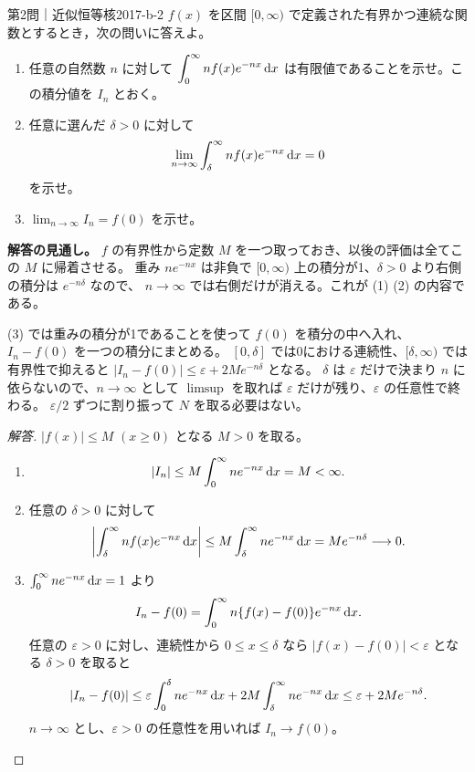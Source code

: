 \begin{problem}{第2問｜近似恒等核}{2017-b-2}
$f(x)$ を区間 $[0,\infty)$ で定義された有界かつ連続な関数とするとき，次の問いに答えよ。
\begin{enumerate}
  \item[(1)] 任意の自然数 $n$ に対して $\displaystyle\int_0^\infty nf(x)e^{-nx}\,\mathrm{d} x$ は有限値であることを示せ。この積分値を $I_n$ とおく。
  \item[(2)] 任意に選んだ $\delta>0$ に対して
  \[
  \lim_{n\to\infty}\int_\delta^\infty nf(x)e^{-nx}\,\mathrm{d} x=0
  \]
  を示せ。
  \item[(3)] $\displaystyle\lim_{n\to\infty}I_n=f(0)$ を示せ。
\end{enumerate}
\end{problem}
\begin{memo*}
\textbf{解答の見通し。}
$f$ の有界性から定数 $M$ を一つ取っておき、以後の評価は全てこの $M$ に帰着させる。
重み $ne^{-nx}$ は非負で $[0,\infty)$ 上の積分が1、$\delta>0$ より右側の積分は $e^{-n\delta}$ なので、
$n\to\infty$ では右側だけが消える。これが (1) (2) の内容である。

(3) では重みの積分が1であることを使って $f(0)$ を積分の中へ入れ、$I_n-f(0)$ を一つの積分にまとめる。
$[0,\delta]$ では0における連続性、$[\delta,\infty)$ では有界性で抑えると
$|I_n-f(0)|\le\varepsilon+2Me^{-n\delta}$ となる。
$\delta$ は $\varepsilon$ だけで決まり $n$ に依らないので、$n\to\infty$ として $\limsup$ を取れば
$\varepsilon$ だけが残り、$\varepsilon$ の任意性で終わる。
$\varepsilon/2$ ずつに割り振って $N$ を取る必要はない。
\end{memo*}
\begin{proof}[解答]
$|f(x)|\le M$ $(x\ge0)$ となる $M>0$ を取る。
\begin{enumerate}
  \item[(1)]
  \[
  |I_n|\le M\int_0^\infty ne^{-nx}\,\mathrm{d} x=M<\infty.
  \]

  \item[(2)] 任意の $\delta>0$ に対して
  \[
  \left|\int_\delta^\infty nf(x)e^{-nx}\,\mathrm{d} x\right|
  \le M\int_\delta^\infty ne^{-nx}\,\mathrm{d} x
  =Me^{-n\delta}\longrightarrow0.
  \]

  \item[(3)] $\int_0^\infty ne^{-nx}\,\mathrm{d} x=1$ より
  \[
  I_n-f(0)=\int_0^\infty n\{f(x)-f(0)\}e^{-nx}\,\mathrm{d} x.
  \]
  任意の $\varepsilon>0$ に対し、連続性から
  $0\le x\le\delta$ なら $|f(x)-f(0)|<\varepsilon$ となる $\delta>0$ を取ると
  \[
  |I_n-f(0)|
  \le\varepsilon\int_0^\delta ne^{-nx}\,\mathrm{d} x
  +2M\int_\delta^\infty ne^{-nx}\,\mathrm{d} x
  \le\varepsilon+2Me^{-n\delta}.
  \]
  $n\to\infty$ とし、$\varepsilon>0$ の任意性を用いれば $I_n\to f(0)$。
\end{enumerate}
\end{proof}

